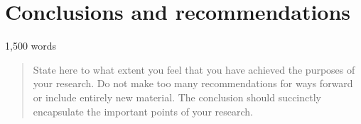 \section{Conclusions and recommendations}
1,500 words 

\begin{quote}
State here to what extent you feel that you have achieved the purposes of your research. Do not make too many recommendations for ways forward or include entirely new material. The conclusion should succinctly encapsulate the important points of your research.
\end{quote}
